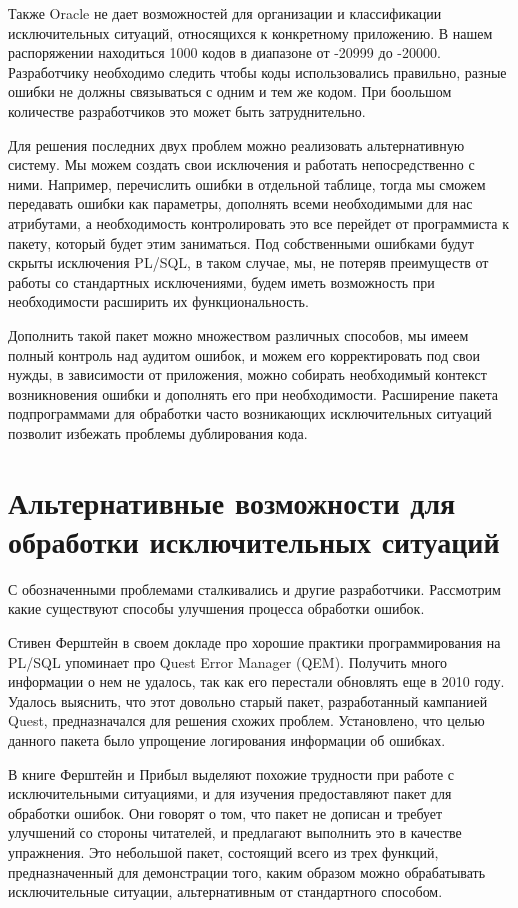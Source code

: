 Также Oracle не дает возможностей для организации и классификации исключительных ситуаций, относящихся к конкретному приложению. В нашем распоряжении находиться 1000 кодов в диапазоне от -20999 до -20000. Разработчику необходимо следить чтобы коды использовались правильно, разные ошибки не должны связываться с одним и тем же кодом\cite{ferstein}. При боольшом количестве разработчиков это может быть затруднительно.

Для решения последних двух проблем можно реализовать альтернативную систему. Мы можем создать свои исключения и работать непосредственно с ними. Например, перечислить ошибки в отдельной таблице, тогда мы сможем передавать ошибки как параметры, дополнять всеми необходимыми для нас атрибутами, а необходимость контролировать это все перейдет от программиста к пакету, который будет этим заниматься. Под собственными ошибками будут скрыты исключения PL/SQL, в таком случае, мы, не потеряв преимуществ от работы со стандартных исключениями, будем иметь возможность при необходимости расширить их функциональность\cite{kite}. 

Дополнить такой пакет можно множеством различных способов, мы имеем полный контроль над аудитом ошибок, и можем его корректировать под свои нужды, в зависимости от приложения, можно собирать необходимый контекст возникновения ошибки и дополнять его при необходимости. Расширение пакета подпрограммами для обработки часто возникающих исключительных ситуаций позволит избежать проблемы дублирования кода. 


\section{Альтернативные возможности для обработки исключительных ситуаций}\label{ch2:sec2}

С обозначенными проблемами сталкивались и другие разработчики. Рассмотрим какие существуют способы улучшения процесса обработки ошибок. 

Стивен Ферштейн в своем докладе \cite{BestPracticePLSQL} про хорошие практики программирования на PL/SQL упоминает про Quest Error Manager (QEM). Получить много информации о нем не удалось, так как его перестали обновлять еще в 2010 году. Удалось выяснить, что этот довольно старый пакет, разработанный кампанией Quest, предназначался для решения схожих проблем. Установлено, что целью данного пакета было упрощение логирования информации об ошибках. 

В книге \cite{ferstein} Ферштейн и Прибыл выделяют похожие трудности при работе с исключительными ситуациями, и для изучения предоставляют пакет для обработки ошибок. Они говорят о том, что пакет не дописан и требует улучшений со стороны читателей, и предлагают выполнить это в качестве упражнения. Это небольшой пакет, состоящий всего из трех функций, предназначенный для демонстрации того, каким образом можно обрабатывать исключительные ситуации, альтернативным от стандартного способом. 

